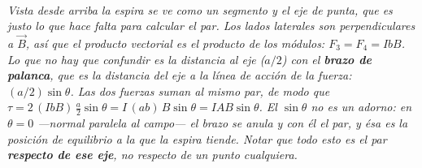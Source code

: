 \begin{center}
\begin{tikzpicture}[scale=1]
\end{tikzpicture}\\[0.5em]
{\small\itshape Vista desde arriba la espira se ve como un segmento y el eje de
punta, que es justo lo que hace falta para calcular el par. Los lados laterales
son perpendiculares a $\vec B$, así que el producto vectorial es el producto de
los módulos: $F_3=F_4=IbB$. Lo que no hay que confundir es la distancia al eje
($a/2$) con el \textbf{brazo de palanca}, que es la distancia del eje a la
\emph{línea de acción} de la fuerza: $(a/2)\sin\theta$. Las dos fuerzas suman al
mismo par, de modo que
$\tau = 2\,(IbB)\,\tfrac{a}{2}\sin\theta = I\,(ab)\,B\sin\theta = IAB\sin\theta$.
El $\sin\theta$ no es un adorno: en $\theta=0$ ---normal paralela al campo--- el
brazo se anula y con él el par, y ésa es la posición de equilibrio a la que la
espira tiende. Notar que todo esto es el par \textbf{respecto de ese eje}, no
respecto de un punto cualquiera.}
\end{center}
